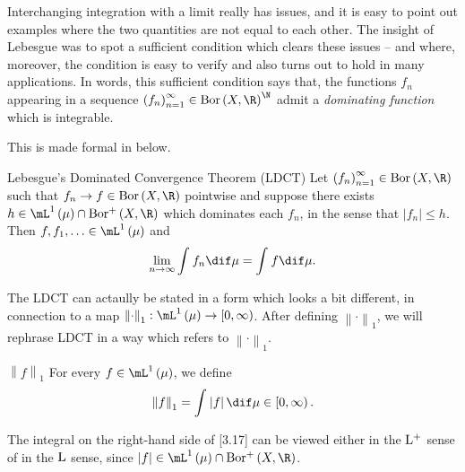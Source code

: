 \documentclass[pmath450]{subfiles}
\begin{document}
    Interchanging integration with a limit really has issues, and it is easy to point out examples where the two quantities are not equal to each other. The insight of Lebesgue was to spot a sufficient condition which clears these issues -- and where, moreover, the condition is easy to verify and also turns out to hold in many applications. In words, this sufficient condition says that, the functions $f_n$ appearing in a sequence $\left( f_{n} \right)^{\infty}_{n=1}\in\bor\left( X,\R \right)^{\N}$ admit a \textit{dominating function} which is integrable.
    
    This is made formal in below.

    \clearpage
    \begin{theorem}{Lebesgue's Dominated Convergence Theorem (LDCT)}
        Let $\left( f_{n} \right)^{\infty}_{n=1}\in\bor\left( X,\R \right)$ such that $f_n\to f\in\bor\left( X,\R \right)$ pointwise and suppose there exists $h\in\lone\left( \mu \right)\cap\borplus\left( X,\R \right)$ which dominates each $f_n$, in the sense that $\left| f_n \right|\leq h$. Then $f,f_1,\ldots\in\lone\left( \mu \right)$ and
        \begin{equation*}
            \lim_{n\to\infty}\int^{}_{}f_n\dif\mu = \int^{}_{}f\dif\mu.
        \end{equation*}
    \end{theorem}

    \rruleline

    \np The LDCT can actaully be stated in a form which looks a bit different, in connection to a map $\left\lVert \cdot \right\rVert_{1}:\lone\left( \mu \right)\to\left[ 0,\infty \right)$. After defining $\left\lVert \cdot \right\rVert_{1}$, we will rephrase LDCT in a way which refers to $\left\lVert \cdot \right\rVert_{1}$.

    \begin{notation}{$\left\lVert f \right\rVert_{1}$}
        For every $f\in\lone\left( \mu \right)$, we define
        \begin{equation}
            \left\lVert f \right\rVert_{1} = \int^{}_{}\left| f \right|\dif\mu\in\left[ 0,\infty \right).
        \end{equation}
    \end{notation}

    \np The integral on the right-hand side of [3.17] can be viewed either in the $\operatorname{L^+}$ sense of in the $\operatorname{L}$ sense, since $\left| f \right|\in\lone\left( \mu \right)\cap\borplus\left( X,\R \right)$. 
\end{document}
